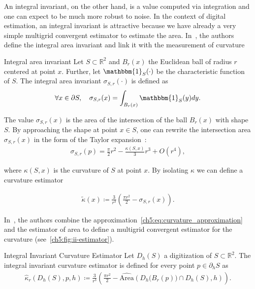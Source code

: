 An integral invariant, on the other hand, is a value computed via integration and one can expect to be much more robust to noise. In the context of digital estimation, an integral invariant is attractive because we have already a very simple multigrid convergent estimator to estimate the area. In~\cite{manay04intinvariant}, the authors define the integral area invariant and link it with the measurement of curvature

\begin{definition}{Integral area invariant}
  Let $S \subset \mathbb{R}^2$ and $B_r(x)$ the Euclidean ball of radius $r$ centered at point $x$. Further, let  $\mathbbm{1}_S(\cdot)$ be the characteristic function of $S$. The integral area invariant $\sigma_{S,r}(\cdot)$ is
  defined as
  \begin{align*}
    \forall x \in \partial S, \quad \sigma_{S,r}(x) = \int_{B_r(x)}{ \mathbbm{1}_S(y) dy}.
  \end{align*}
\end{definition}


The value $\sigma_{S,r}(x)$ is the area of the intersection of the ball $B_r(x)$ with shape $S$. By approaching the shape at point $x \in S$, one can rewrite the intersection area $\sigma_{S,r}(x)$ in the form of the Taylor expansion~\cite{pottman09intinvariant}:
\begin{align*}
  \sigma_{S,r}(p) = \frac{\pi}{2}r^2 - \frac{\kappa(S,x)}{3}r^3 + O(r^4),
\end{align*}
		
where $\kappa(S,x)$ is the curvature of $S$ at point $x$. By isolating $\kappa$ we can define a curvature estimator
	
\begin{align}
  \tilde{\kappa}(x) \coloneqq \frac{3}{r^3}\left( \frac{\pi r^2}{2} - \sigma_{S,r}(x) \right).
  \label{ch5:eq:curvature_approximation}
\end{align}
	
In~\cite{coeurjolly13integral}, the authors combine the approximation~\cref{ch5:eq:curvature_approximation} and the estimator of area to define a multigrid convergent estimator for the curvature (see~\cref{ch5:fig:ii-estimator}).

\begin{definition}{Integral Invariant Curvature Estimator}
  Let $D_h(S)$ a digitization of $S \subset \mathbb{R}^2$. The integral invariant curvature estimator is defined for every point $p \in \partial_h S$ as
  \begin{align*}
    \hat{\kappa}_{r}(D_h(S),p,h) \coloneqq \frac{3}{r^3} \left( \frac{\pi r^2}{2} - \widehat{\text{Area}} \left( D_h\big( B_{r} ( p ) \big) \cap D_h(S), h \right) \right).
  \end{align*}
\end{definition}


